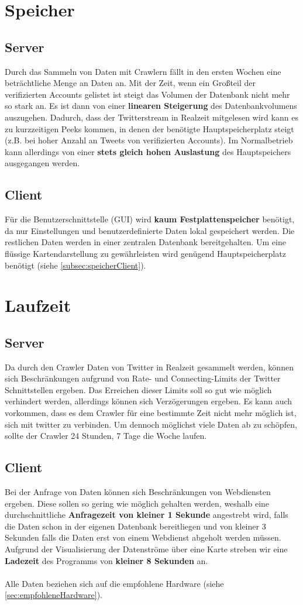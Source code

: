 \section{Speicher}
\subsection{Server}
Durch das Sammeln von Daten mit Crawlern fällt in den ersten Wochen eine beträchtliche Menge an Daten an. Mit der Zeit, wenn ein Großteil der verifizierten Accounts gelistet ist steigt das Volumen der Datenbank nicht mehr so stark an. Es ist dann von einer \textbf{linearen Steigerung} des Datenbankvolumens auszugehen. 
Dadurch, dass der Twitterstream in Realzeit mitgelesen wird kann es zu  kurzzeitigen Peeks kommen, in denen der benötigte Hauptspeicherplatz steigt (z.B. bei hoher Anzahl an Tweets von verifizierten Accounts). Im Normalbetrieb kann allerdings von einer \textbf{stets gleich hohen Auslastung} des Hauptspeichers ausgegangen werden.
\subsection{Client}
Für die Benutzerschnittstelle (GUI) wird \textbf{kaum Festplattenspeicher} benötigt, da nur Einstellungen und benutzerdefinierte Daten lokal gespeichert werden. Die restlichen Daten werden in einer zentralen Datenbank bereitgehalten.
Um eine flüssige Kartendarstellung zu gewährleisten wird genügend Hauptspeicherplatz benötigt (siehe \ref{subsec:speicherClient}).
\section{Laufzeit}
\subsection{Server}
Da durch den Crawler Daten von Twitter in Realzeit gesammelt werden, können sich Beschränkungen aufgrund von Rate- und Connecting-Limits der Twitter Schnittstellen ergeben. Das Erreichen dieser Limits soll so gut wie möglich verhindert werden, allerdings können sich Verzögerungen ergeben. Es kann auch vorkommen, dass es dem Crawler für eine bestimmte Zeit nicht mehr möglich ist, sich mit twitter zu verbinden. Um dennoch möglichst viele Daten ab zu schöpfen, sollte der Crawler 24 Stunden, 7 Tage die Woche laufen.
\subsection{Client}
Bei der Anfrage von Daten können sich Beschränkungen von Webdiensten ergeben. Diese sollen so gering wie möglich gehalten werden, weshalb eine durchschnittliche \textbf{Anfragezeit von kleiner 1 Sekunde} angestrebt wird, falls die Daten schon in der eigenen Datenbank bereitliegen und von kleiner 3 Sekunden falls die Daten erst von einem Webdienst abgeholt werden müssen.
Aufgrund der Visualisierung der Datenströme über eine Karte streben wir eine \textbf{Ladezeit} des Programms von \textbf{kleiner 8 Sekunden} an.\\\\
Alle Daten beziehen sich auf die empfohlene Hardware (siehe \ref{sec:empfohleneHardware}).